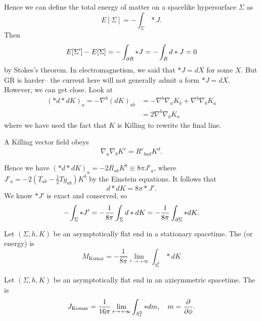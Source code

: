 Hence we can define the total energy of matter on a spacelike hypersurface $\Sigma$ as
\begin{equation}
    E[\Sigma]=-\int_\Sigma * J.
\end{equation}
Then
\begin{equation}
    E[\Sigma']-E[\Sigma]=-\int_{\p R} *J = -\int_R d* J = 0
\end{equation}
by Stokes's theorem. In electromagnetism, we said that $*J=dX$ for some $X$. But GR is harder-- the current here will not generally admit a form $*J=dX$. However, we can get close. Look at
\begin{align*}
    (*d*dK)_a = -\nabla^b(dK)_{ab}&=-\nabla^b \nabla_a K_b + \nabla^b \nabla_b K_a\\
    &= 2\nabla^b \nabla_b K_a
\end{align*}
where we have used the fact that $K$ is Killing to rewrite the final line.
\begin{lem}
    A Killing vector field obeys
    \begin{equation}
        \nabla_a \nabla_b K^c = R^c{}_{bad} K^d.
    \end{equation}
\end{lem}
Hence we have $(*d*d K)_a = -2R_{ab}K^b \equiv 8\pi J'_a$,
where $J'_a = -2(T_{ab}-\frac{1}{2}T g_{ab})K^b$ by the Einstein equations. It follows that
\begin{equation}
    d*dK=8\pi * J'.
\end{equation}
We know $*J'$ is exact and conserved, so
\begin{equation}
    -\int_\Sigma * J' = -\frac{1}{8\pi} \int_\Sigma d* dK = -\frac{1}{8\pi}\int_{\p \Sigma} *dK.
\end{equation}
\begin{defn}
    Let $(\Sigma,h,K)$ be an asymptotically flat end in a stationary spacetime. The  (or energy) is
    \begin{equation}
        M_{\text{Komar}}=-\frac{1}{8\pi} \lim_{r\to +\infty} \int_{S^2_r} * dK
    \end{equation}
\end{defn}
\begin{defn}
    Let $(\Sigma,h,K)$ be an asymptotically flat end in an axisymmetric spacetime. The  is
    \begin{equation}
        J_{\text{Komar}}=\frac{1}{16\pi} \lim_{r\to +\infty} \int_{S^2_r} *dm, \quad m=\P{}{\phi}.
    \end{equation}
\end{defn}